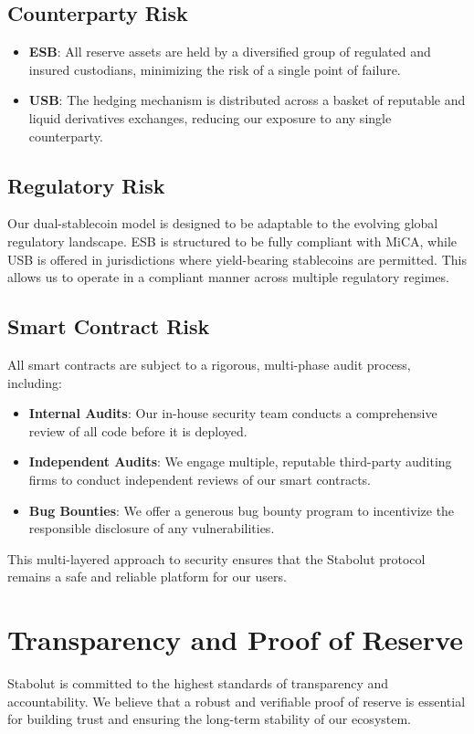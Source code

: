 \subsection{Counterparty Risk}
\begin{itemize}
    \item \textbf{ESB}: All reserve assets are held by a diversified group of regulated and insured custodians, minimizing the risk of a single point of failure.
    \item \textbf{USB}: The hedging mechanism is distributed across a basket of reputable and liquid derivatives exchanges, reducing our exposure to any single counterparty.
\end{itemize}

\subsection{Regulatory Risk}
Our dual-stablecoin model is designed to be adaptable to the evolving global regulatory landscape. ESB is structured to be fully compliant with MiCA, while USB is offered in jurisdictions where yield-bearing stablecoins are permitted. This allows us to operate in a compliant manner across multiple regulatory regimes.

\subsection{Smart Contract Risk}
All smart contracts are subject to a rigorous, multi-phase audit process, including:
\begin{itemize}
    \item \textbf{Internal Audits}: Our in-house security team conducts a comprehensive review of all code before it is deployed.
    \item \textbf{Independent Audits}: We engage multiple, reputable third-party auditing firms to conduct independent reviews of our smart contracts.
    \item \textbf{Bug Bounties}: We offer a generous bug bounty program to incentivize the responsible disclosure of any vulnerabilities.
\end{itemize}

This multi-layered approach to security ensures that the Stabolut protocol remains a safe and reliable platform for our users.

\section{Transparency and Proof of Reserve}
Stabolut is committed to the highest standards of transparency and accountability. We believe that a robust and verifiable proof of reserve is essential for building trust and ensuring the long-term stability of our ecosystem.

